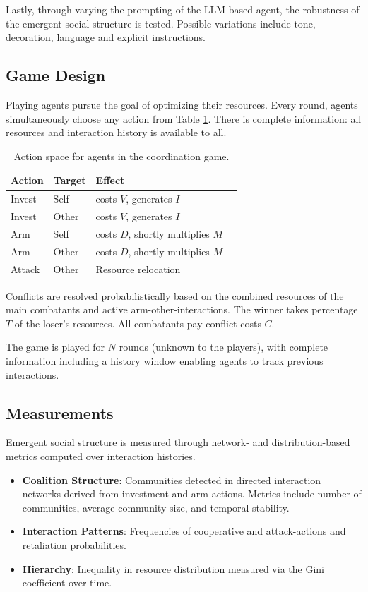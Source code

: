 Lastly, through varying the prompting of the LLM-based agent, the robustness of the emergent social structure is tested. Possible variations include tone, decoration, language and explicit instructions. 

\subsection{Game Design}
Playing agents pursue the goal of optimizing their resources. Every round, agents simultaneously choose any action from Table \ref{tab:actions}. There is complete information: all resources and interaction history is available to all.

\begin{table}[h]
\centering
\begin{tabular}{@{}llll@{}}
\toprule
\textbf{Action} & \textbf{Target} & \textbf{Effect} \\
\midrule
Invest & Self & costs $V$, generates $I$ \\
Invest & Other & costs $V$, generates $I$ \\
Arm & Self & costs $D$, shortly multiplies $M$ \\
Arm & Other & costs $D$, shortly multiplies $M$ \\
Attack & Other & Resource relocation \\
\bottomrule
\end{tabular}
\caption{Action space for agents in the coordination game.}
\label{tab:actions}
\end{table}

Conflicts are resolved probabilistically based on the combined resources of the main combatants and active arm-other-interactions. The winner takes percentage $T$ of the loser's resources. All combatants pay conflict costs $C$.

The game is played for $N$ rounds (unknown to the players), with complete information including a history window enabling agents to track previous interactions.

\subsection{Measurements}
Emergent social structure is measured through network- and distribution-based metrics computed over interaction histories.

\begin{itemize}
    \item \textbf{Coalition Structure}: Communities detected in directed interaction networks derived from investment and arm actions. Metrics include number of communities, average community size, and temporal stability.
    \item \textbf{Interaction Patterns}: Frequencies of cooperative and attack-actions and retaliation probabilities.
    \item \textbf{Hierarchy}: Inequality in resource distribution measured via the Gini coefficient over time.
\end{itemize}

